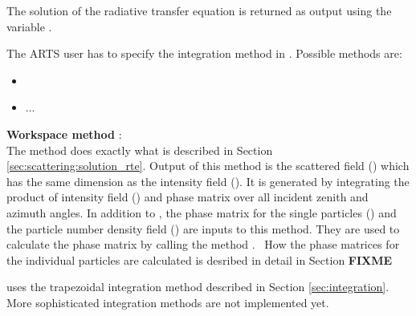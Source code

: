 The solution of the radiative transfer equation is returned as output
using the variable .


\label{sec:scattering:sca_fieldCalc}

The ARTS user has to specify the integration method in . Possible methods are:\\
\begin{itemize}
\item {}
\item ...
\end{itemize}

{\bf Workspace method }:\\
The method  does exactly what is described
in Section \ref{sec:scattering:solution_rte}.  Output of this method
is the scattered field () which has the same
dimension as the intensity field ().  It is
generated by integrating the product of intensity field
() and phase matrix  over all
incident zenith and azimuth angles.  In addition to
, the phase matrix for the single particles
() and the particle number density field
() are inputs to this method.  They are used to
calculate the phase matrix  by calling the method
.\ %
 How the phase matrices for the individual particles are calculated is desribed in detail in Section {\bf FIXME} %

 uses the trapezoidal integration method
described in Section \ref{sec:integration}. More sophisticated
integration methods are not implemented yet.


\label{sec:scattering:RT_methods}

